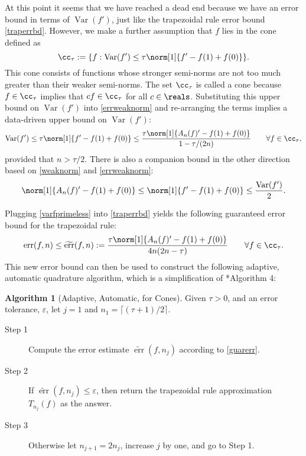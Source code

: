 \documentclass[]{article}
\DeclareMathOperator{\Var}{Var}
\DeclareMathOperator{\err}{err}
\newcommand{\terr}{\widetilde{\err}}
\theoremstyle{definition}
\newtheorem{algo}{Algorithm}
\theoremstyle{remark}
\begin{document}
At this point it seems that we have reached a dead end because we have an error bound in terms of $\Var(f')$, just like the trapezoidal rule error bound \eqref{traperrbd}.  However, we make a further assumption that $f$ lies in the cone defined as 
\begin{equation} \label{conedef}
\cc_{\tau} := \{f : \Var(f') \le \tau \norm[1]{f'-f(1)+f(0)} \}.
\end{equation}
This cone consists of functions whose stronger semi-norms are not too much greater than their weaker semi-norms.  The set $\cc_{\tau}$ is called a cone because $f \in \cc_{\tau}$ implies that $cf \in \cc_{\tau}$ for all $c \in \reals$.  Substituting this upper bound on $\Var(f')$ into \eqref{errweaknorm} and re-arranging the terms implies a data-driven upper bound on  $\Var(f')$:
\begin{equation} \label{varfprimeless}
\Var(f') \le \tau \norm[1]{f'-f(1)+f(0)}  \le \frac{\tau \norm[1]{A_n(f)'-f(1)+f(0)}}{1-\tau/(2n)} \qquad \forall f \in \cc_{\tau},
\end{equation}
provided that $n>\tau/2$.  There is also a companion bound in the other direction based on \eqref{weaknorm} and \eqref{errweaknorm}:
\begin{equation} \label{varfprimegreat}
\norm[1]{A_n(f)'-f(1)+f(0)} \le \norm[1]{f'-f(1)+f(0)} \le \frac{\Var(f')}{2}.
\end{equation}

Plugging \eqref{varfprimeless} into \eqref{traperrbd} yields the following guaranteed error bound for the trapezoidal rule:
\begin{equation} \label{guarerr}
\err(f,n) \le \terr(f,n) := \frac{\tau \norm[1]{A_n(f)'-f(1)+f(0)}} {4n(2n-\tau)} \qquad \forall f \in \cc_{\tau}.
\end{equation}
This new error bound can then be used to construct the following adaptive, automatic quadrature algorithm, which is a simplification of *{Algorithm 4}:

\begin{algo}[Adaptive, Automatic, for Cones] \label{conealgo} Given $\tau>0$, and an error tolerance, $\varepsilon$, let $j=1$ and $n_1=\lceil (\tau+1)/2 \rceil$.

\begin{description} 

\item[Step 1] Compute the error estimate $\terr(f,n_j)$ according to \eqref{guarerr}.

\item [Step 2] If $\terr(f,n_j) \le \varepsilon$, then return the trapezoidal rule approximation $T_{n_j}(f)$ as the answer.  

\item [Step 3] Otherwise let $n_{j+1}=2 n_j$, increase $j$ by one, and go to Step 1.

\end{description}
\end{algo}
\end{document}
